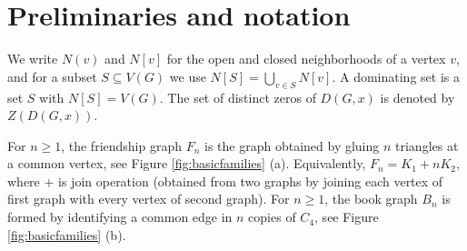 \documentclass[12pt]{article}
\theoremstyle{definition}
\begin{document}
	\section{Preliminaries and notation}\label{section 2}
	
	We write $N(v)$ and $N[v]$ for the open and closed neighborhoods of a vertex $v$, and for a subset $S\subseteq V(G)$ we use $N[S]=\bigcup_{v\in S}N[v]$. A dominating set is a set $S$ with $N[S]=V(G)$. The set of distinct zeros of $D(G,x)$ is denoted by $Z(D(G,x))$.
	
	For $n\ge 1$, the friendship graph $F_n$ is the graph obtained by gluing $n$ triangles at a common vertex, see Figure \ref{fig:basicfamilies} (a). Equivalently,
	$ F_n=K_1+nK_2,$ where $+$ is join operation (obtained from two graphs by joining each vertex of first graph with every vertex of second graph).
	For $n\ge 1$, the book graph $B_n$ is formed by identifying a common edge in $n$ copies of $C_4$, see Figure \ref{fig:basicfamilies} (b).
	
\end{document}
